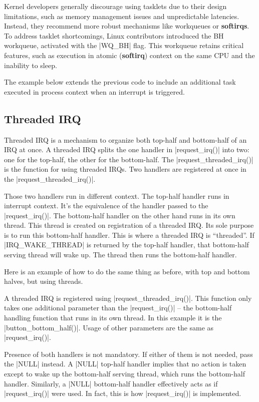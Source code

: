 \documentclass[10pt, oneside]{book}
\begin{document}
Kernel developers generally discourage using tasklets due to their design limitations,
such as memory management issues and unpredictable latencies.
Instead, they recommend more robust mechanisms like workqueues or \textbf{softirqs}.
To address tasklet shortcomings, Linux contributors introduced the BH workqueue,
activated with the \cpp|WQ_BH| flag.
This workqueue retains critical features,
such as execution in atomic (\textbf{softirq}) context on the same CPU and the inability to sleep.

The example below extends the previous code to include an additional task executed in process context when an interrupt is triggered.

\subsection{Threaded IRQ}
\label{sec:threaded_irq}
Threaded IRQ is a mechanism to organize both top-half and bottom-half of an IRQ at once.
A threaded IRQ splits the one handler in \cpp|request_irq()| into two: one for the top-half, the other for the bottom-half.
The \cpp|request_threaded_irq()| is the function for using threaded IRQs.
Two handlers are registered at once in the \cpp|request_threaded_irq()|.

Those two handlers run in different context.
The top-half handler runs in interrupt context.
It's the equivalence of the handler passed to the \cpp|request_irq()|.
The bottom-half handler on the other hand runs in its own thread.
This thread is created on registration of a threaded IRQ.
Its sole purpose is to run this bottom-half handler.
This is where a threaded IRQ is ``threaded''.
If \cpp|IRQ_WAKE_THREAD| is returned by the top-half handler, that bottom-half serving thread will wake up.
The thread then runs the bottom-half handler.

Here is an example of how to do the same thing as before, with top and bottom halves, but using threads.


A threaded IRQ is registered using \cpp|request_threaded_irq()|.
This function only takes one additional parameter than the \cpp|request_irq()| -- the bottom-half handling function that runs in its own thread.
In this example it is the \cpp|button_bottom_half()|.
Usage of other parameters are the same as \cpp|request_irq()|.

Presence of both handlers is not mandatory.
If either of them is not needed, pass the \cpp|NULL| instead.
A \cpp|NULL| top-half handler implies that no action is taken except to wake up the bottom-half serving thread, which runs the bottom-half handler.
Similarly, a \cpp|NULL| bottom-half handler effectively acts as if \cpp|request_irq()| were used.
In fact, this is how \cpp|request_irq()| is implemented.
\end{document}
